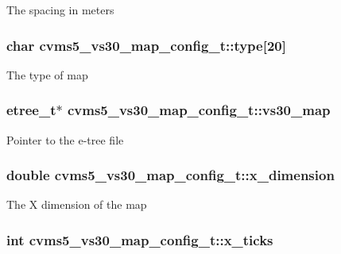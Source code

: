 The spacing in meters \hypertarget{structcvms5__vs30__map__config__t_a669c0c99c3a128deb94766c5b0ea99bd}{
\subsubsection[{type}]{\setlength{\rightskip}{0pt plus 5cm}char cvms5\+\_\+vs30\+\_\+map\+\_\+config\+\_\+t\+::type\mbox{[}20\mbox{]}}}\label{structcvms5__vs30__map__config__t_a669c0c99c3a128deb94766c5b0ea99bd}
The type of map \hypertarget{structcvms5__vs30__map__config__t_ac153f642d35d4addab203a52c6838df6}{
\subsubsection[{vs30\+\_\+map}]{\setlength{\rightskip}{0pt plus 5cm}etree\+\_\+t$\ast$ cvms5\+\_\+vs30\+\_\+map\+\_\+config\+\_\+t\+::vs30\+\_\+map}}\label{structcvms5__vs30__map__config__t_ac153f642d35d4addab203a52c6838df6}
Pointer to the e-\/tree file \hypertarget{structcvms5__vs30__map__config__t_aec8944642bfdb88ee31a579354017aa4}{
\subsubsection[{x\+\_\+dimension}]{\setlength{\rightskip}{0pt plus 5cm}double cvms5\+\_\+vs30\+\_\+map\+\_\+config\+\_\+t\+::x\+\_\+dimension}}\label{structcvms5__vs30__map__config__t_aec8944642bfdb88ee31a579354017aa4}
The X dimension of the map \hypertarget{structcvms5__vs30__map__config__t_a164065872d77b6ffa6e97ccac9aa02c5}{
\subsubsection[{x\+\_\+ticks}]{\setlength{\rightskip}{0pt plus 5cm}int cvms5\+\_\+vs30\+\_\+map\+\_\+config\+\_\+t\+::x\+\_\+ticks}}\label{structcvms5__vs30__map__config__t_a164065872d77b6ffa6e97ccac9aa02c5}
